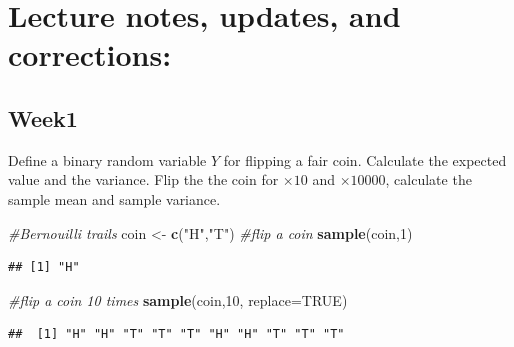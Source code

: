 \documentclass[
]{book}
\newenvironment{Shaded}{\begin{snugshade}}{\end{snugshade}}
\newcommand{\CommentTok}[1]{\textcolor[rgb]{0.56,0.35,0.01}{\textit{#1}}}
\newcommand{\DataTypeTok}[1]{\textcolor[rgb]{0.13,0.29,0.53}{#1}}
\newcommand{\DecValTok}[1]{\textcolor[rgb]{0.00,0.00,0.81}{#1}}
\newcommand{\KeywordTok}[1]{\textcolor[rgb]{0.13,0.29,0.53}{\textbf{#1}}}
\newcommand{\NormalTok}[1]{#1}
\newcommand{\OtherTok}[1]{\textcolor[rgb]{0.56,0.35,0.01}{#1}}
\newcommand{\StringTok}[1]{\textcolor[rgb]{0.31,0.60,0.02}{#1}}
\begin{document}
\hypertarget{lecture-notes-updates-and-corrections}{%
\chapter{Lecture notes, updates, and corrections:}\label{lecture-notes-updates-and-corrections}}

\hypertarget{week1}{%
\section{Week1}\label{week1}}

Define a binary random variable \(Y\) for flipping a fair coin. Calculate the expected value and the variance. Flip the the coin for \(\times 10\) and \(\times 10000\), calculate the sample mean and sample variance.

\begin{Shaded}
\begin{Highlighting}[]
\CommentTok{#Bernouilli trails }
\NormalTok{coin <-}\StringTok{ }\KeywordTok{c}\NormalTok{(}\StringTok{"H"}\NormalTok{,}\StringTok{"T"}\NormalTok{)}
\CommentTok{#flip a coin }
\KeywordTok{sample}\NormalTok{(coin,}\DecValTok{1}\NormalTok{)}
\end{Highlighting}
\end{Shaded}

\begin{verbatim}
## [1] "H"
\end{verbatim}

\begin{Shaded}
\begin{Highlighting}[]
\CommentTok{#flip a coin 10 times}
\KeywordTok{sample}\NormalTok{(coin,}\DecValTok{10}\NormalTok{, }\DataTypeTok{replace=}\OtherTok{TRUE}\NormalTok{)}
\end{Highlighting}
\end{Shaded}

\begin{verbatim}
##  [1] "H" "H" "T" "T" "T" "H" "H" "T" "T" "T"
\end{verbatim}
\end{document}
